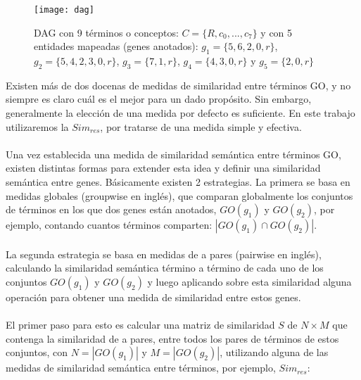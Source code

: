 \begin{figure}[h]
    \centering
    \texttt{[image: dag]}
    \caption{DAG con 9 términos o conceptos: $C=\{R, c_0,...,c_7\}$ y con 5 entidades mapeadas (genes anotados): $g_1=\{5, 6, 2, 0, r\}$, $g_2=\{5, 4, 2, 3, 0, r\}$, $g_3=\{7, 1, r\}$, $g_4=\{4, 3, 0, r\}$ y $g_5=\{2, 0, r\}$}
    \label{fig:dag}
\end{figure}
Existen más de dos docenas de medidas de similaridad entre términos GO, y no siempre es claro cuál es el mejor para un dado propósito. Sin embargo, generalmente la elección de una medida por defecto es suficiente\cite{Bose2016}. En este trabajo utilizaremos la $Sim_{res}$, por tratarse de una medida simple y efectiva.\\\\
Una vez establecida una medida de similaridad semántica entre términos GO, existen distintas formas para extender esta idea y definir una similaridad semántica entre genes. Básicamente existen 2
estrategias. La primera se basa en medidas globales (groupwise en inglés), que comparan globalmente los conjuntos de términos en los que dos genes están anotados, $GO(g_1)$ y $GO(g_2)$, por ejemplo, contando cuantos términos comparten: $|GO(g_1) \cap GO(g_2)|$.\cite{Lee2004} \\\\
La segunda estrategia se basa en medidas de a pares (pairwise en inglés), calculando la similaridad semántica término a término de cada uno de los conjuntos $GO(g_1)$ y $GO(g_2)$ y luego aplicando sobre esta similaridad alguna operación para obtener una medida de similaridad entre estos genes.\\\\
El primer paso para esto es calcular una matriz de similaridad $S$ de $N\times M$ que contenga la similaridad de a pares, entre todos los pares de términos de estos conjuntos, con $N=|GO(g_1)|$ y $M=|GO(g_2)|$, utilizando alguna de las medidas de similaridad semántica entre términos, por ejemplo, $Sim_{res}$:

